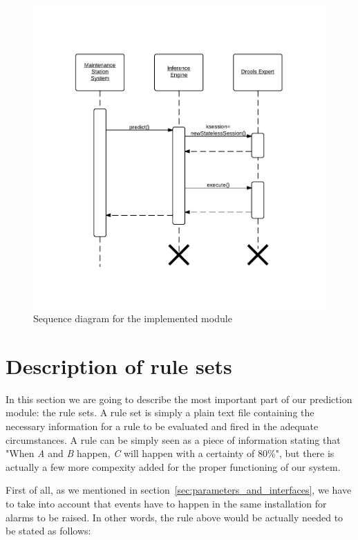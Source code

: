 \begin{figure}[hbtp]
\includegraphics[width=\textwidth]{img/prototypeSequence.pdf}
\caption{Sequence diagram for the implemented module} \label{fig:prototypeSequence}
\end{figure}

\section{Description of rule sets}
\label{sec:description_of_rule_sets}
In this section we are going to describe the most important part of our prediction module: the rule sets. A rule set is simply a plain text file containing the necessary information for a rule to be evaluated and fired in the adequate circumstances. A rule can be simply seen as a piece of information stating that "When \emph{A} and \emph{B} happen, \emph{C} will happen with a certainty of 80\%", but there is actually a few more compexity added for the proper functioning of our system.

First of all, as we mentioned in section~\ref{sec:parameters_and_interfaces}, we have to take into account that events have to happen in the same installation for alarms to be raised. In other words, the rule above would be actually needed to be stated as follows:

